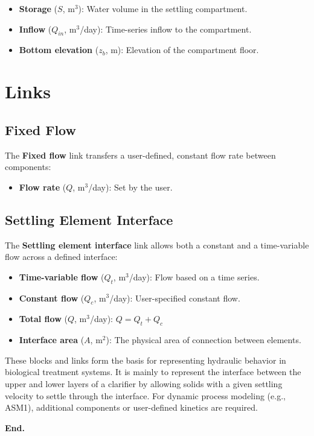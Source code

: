 \documentclass[12pt]{report}
\begin{document}
\begin{itemize}
\item \textbf{Storage} ($S$, m$^3$): Water volume in the settling compartment.
\item \textbf{Inflow} ($Q_{in}$, m$^3$/day): Time-series inflow to the compartment.
\item \textbf{Bottom elevation} ($z_b$, m): Elevation of the compartment floor.
\end{itemize}

\section{Links}
\subsection{Fixed Flow}
The \textbf{Fixed flow} link transfers a user-defined, constant flow rate between components:
\begin{itemize}
\item \textbf{Flow rate} ($Q$, m$^3$/day): Set by the user.
\end{itemize}

\subsection{Settling Element Interface}
The \textbf{Settling element interface} link allows both a constant and a time-variable flow across a defined interface:
\begin{itemize}
\item \textbf{Time-variable flow} ($Q_t$, m$^3$/day): Flow based on a time series.
\item \textbf{Constant flow} ($Q_c$, m$^3$/day): User-specified constant flow.
\item \textbf{Total flow} ($Q$, m$^3$/day): $Q = Q_t + Q_c$
\item \textbf{Interface area} ($A$, m$^2$): The physical area of connection between elements.
\end{itemize}

These blocks and links form the basis for representing hydraulic behavior in biological treatment systems. It is mainly to represent the interface between the upper and lower layers of a clarifier by allowing solids with a given settling velocity to settle through the interface. For dynamic process modeling (e.g., ASM1), additional components or user-defined kinetics are required.


\textbf{End.   }


\end{document}
